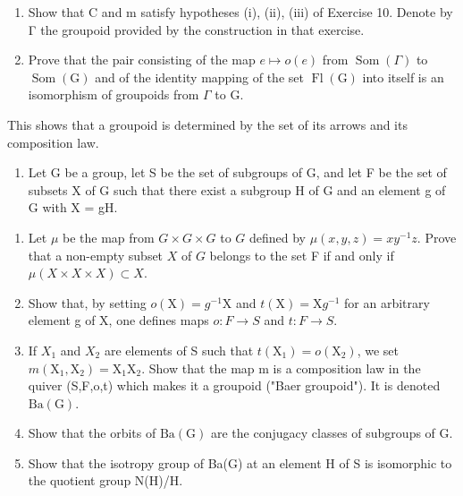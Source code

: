 \begin{enumerate}
\def\labelenumi{\alph{enumi})}
\item
  Show that C and m satisfy hypotheses (i), (ii), (iii) of Exercise 10. Denote by Γ the groupoid provided by the construction in that exercise.
\item
  Prove that the pair consisting of the map \(e \mapsto o(e)\) from \(\operatorname{Som}(\Gamma)\) to \(\operatorname{Som}(\mathrm{G})\) and of the identity mapping of the set \(\operatorname{Fl}(\mathrm{G})\) into itself is an isomorphism of groupoids from \(\Gamma\) to G.
\end{enumerate}

This shows that a groupoid is determined by the set of its arrows and its composition law.

\begin{enumerate}
\def\labelenumi{\arabic{enumi})}
\setcounter{enumi}{11}
\tightlist
\item
  Let G be a group, let S be the set of subgroups of G, and let F be the set of subsets X of G such that there exist a subgroup H of G and an element g of G with X = gH.
\end{enumerate}

\begin{enumerate}
\def\labelenumi{\alph{enumi})}
\item
  Let \(\mu\) be the map from \(G \times G \times G\) to \(G\) defined by \(\mu(x,y,z)=xy^{-1}z\). Prove that a non-empty subset \(X\) of \(G\) belongs to the set F if and only if \(\mu(X\times X\times X)\subset X\).
\item
  Show that, by setting \(o(\mathrm{X}) = g^{-1}\mathrm{X}\) and \(t(\mathrm{X}) = \mathrm{X}g^{-1}\) for an arbitrary element g of X, one defines maps \(o: F \to S\) and \(t: F \to S\).
\item
  If \(X_{1}\) and \(X_{2}\) are elements of S such that \(t(\mathrm{X}_{1}) = o(\mathrm{X}_{2})\), we set \(m(\mathrm{X}_{1}, \mathrm{X}_{2}) = \mathrm{X}_{1}\mathrm{X}_{2}\). Show that the map m is a composition law in the quiver (S,F,o,t) which makes it a groupoid ("Baer groupoid"). It is denoted \(\mathrm{Ba}(\mathrm{G})\).
\item
  Show that the orbits of \(\mathrm{Ba}(\mathrm{G})\) are the conjugacy classes of subgroups of G.
\item
  Show that the isotropy group of Ba(G) at an element H of S is isomorphic to the quotient group N(H)/H.
\end{enumerate}

